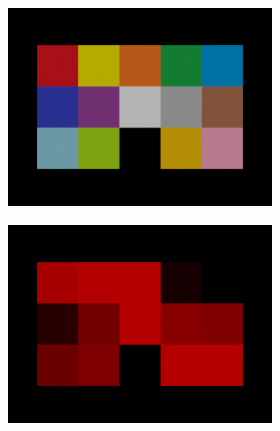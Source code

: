 \begin{figure}[ht]
\begin{subfigure}{\textwidth}
        \begin{subfigure}{0.24\textwidth}
            \centering
            \includegraphics[width=\textwidth]{images/02-spd_intuition-palette_white.png}
            \caption*{}
            \label{fig:background_spd_intuition-palette_white}
        \end{subfigure}
        \hfill
        \begin{subfigure}{0.24\textwidth}
            \centering
            \includegraphics[width=\textwidth]{images/02-spd_intuition-palette_red.png}
            \caption*{}
            \label{fig:background_spd_intuition-palette_red}
        \end{subfigure}
        \hfill
        \begin{subfigure}{0.24\textwidth}

\end{subfigure}
\end{subfigure}
\end{figure}
